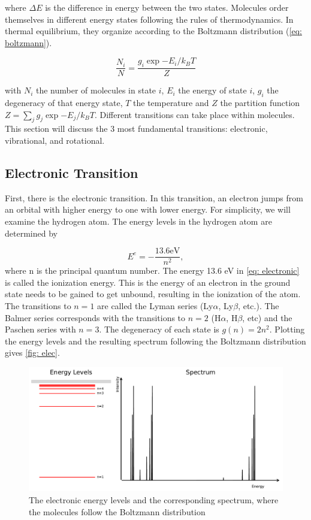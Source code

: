 \documentclass[twoside, single, authoryear, semicolon]{lion-msc}
\newcommand{\4}{$_4$}
\newcommand{\3}{$_3$}
\newcommand{\2}{$_2$}
\begin{document}
where $\Delta E$ is the difference in energy between the two states. Molecules order themselves in different energy states following the rules of thermodynamics. In thermal equilibrium, they organize according to the Boltzmann distribution (\autoref{eq: boltzmann}). 

\begin{equation}
    \frac{N_i}{N}=\frac{g_i\exp{-E_i/k_BT}}{Z}
    \label{eq: boltzmann}
\end{equation}

with $N_i$ the number of molecules in state $i$, $E_i$ the energy of state $i$, $g_i$ the degeneracy of that energy state,  $T$ the temperature and $Z$ the partition function $Z=\sum_j g_j\exp{-E_j/k_BT}$.
Different transitions can take place within molecules. This section will discuss the 3 most fundamental transitions: electronic, vibrational, and rotational.

\subsection{Electronic Transition}
First, there is the electronic transition. In this transition, an electron jumps from an orbital with higher energy to one with lower energy. For simplicity, we will examine the hydrogen atom. The energy levels in the hydrogen atom are determined by 

\begin{equation}
    E^e=-\frac{13.6\mathrm{ eV}}{n^2},
    \label{eq: electronic}
\end{equation}
where n is the principal quantum number. The energy 13.6 eV in \autoref{eq: electronic} is called the ionization energy. This is the energy of an electron in the ground state needs to be gained to get unbound, resulting in the ionization of the atom. The transitions to $n=1$ are called the Lyman series (Ly$\alpha$, Ly$\beta$, etc.). The Balmer series corresponds with the transitions to $n=2$ (H$\alpha$, H$\beta$, etc) and the Paschen series with $n=3$. The degeneracy of each state is $g(n)=2n^2$. Plotting the energy levels and the resulting spectrum following the Boltzmann distribution gives \autoref{fig: elec}.

\begin{figure}[!ht]
    \centering
    \includegraphics[width=\linewidth]{Figures/ElecSpectrum.pdf}
    \caption{The electronic energy levels and the corresponding spectrum, where the molecules follow the Boltzmann distribution}
    \label{fig: elec}
\end{figure}
\end{document}
